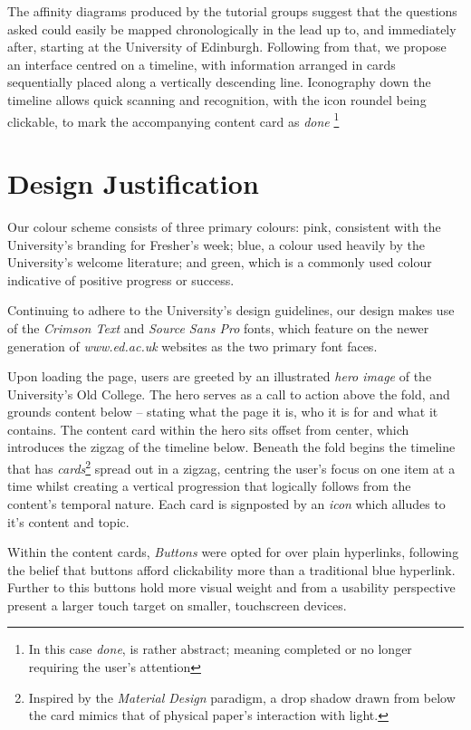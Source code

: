 \documentclass[a4paper, notoc]{tufte-handout}
\begin{document}
The affinity diagrams produced by the tutorial groups suggest that the questions asked could 
easily be mapped chronologically in the lead up to, and immediately after, starting at the 
University of Edinburgh. Following from that, we propose an interface centred on a timeline, 
with information arranged in cards sequentially placed along a vertically descending line. 
Iconography down the timeline allows quick scanning and recognition, with the icon roundel 
being clickable, to mark the accompanying content card as \textit{done}
\footnote{In this case \textit{done}, is rather abstract; meaning completed or no longer 
requiring the user's attention}


\section{Design Justification}\label{sec:design-justification}

Our colour scheme consists of three primary colours: pink, consistent with the University's 
branding for Fresher's week; blue, a colour used heavily by the University's welcome literature; 
and green, which is a commonly used colour indicative of positive progress or success.

Continuing to adhere to the University's design guidelines, our design makes use of the 
\textit{Crimson Text} and \textit{Source Sans Pro} fonts, which feature on the newer 
generation of \textit{www.ed.ac.uk} websites as the two primary font faces.

Upon loading the page, users are greeted by an illustrated \textit{hero image} of the 
University's Old College. The hero serves as a call to action above the fold, and grounds 
content below -- stating what the page it is, who it is for and what it contains. The content 
card within the hero sits offset from center, which introduces the zigzag of the timeline 
below. Beneath the fold begins the timeline that has \textit{cards}\footnote{Inspired by 
the \textit{Material Design} paradigm, a drop shadow drawn from below the card mimics that 
of physical paper's interaction with light.} spread out in a zigzag, centring the user's 
focus on one item at a time whilst creating a vertical progression that logically follows 
from the content's temporal nature. Each card is signposted by an \textit{icon} which alludes 
to it's content and topic. 

Within the content cards, \textit{Buttons} were opted for over plain hyperlinks, following 
the belief that buttons afford clickability more than a traditional blue hyperlink. Further 
to this buttons hold more visual weight and from a usability perspective present a larger 
touch target on smaller, touchscreen devices.
\end{document}
